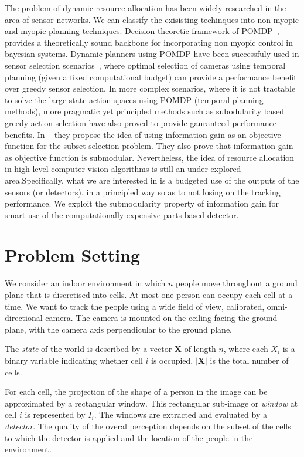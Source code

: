 \documentclass[10pt,twocolumn,letterpaper]{article}
\begin{document}
The problem of dynamic resource allocation has been widely researched in the area of sensor networks. We can classify the exisisting techinques into non-myopic and myopic planning techniques.  Decision theoretic framework of POMDP~\cite{Kaelbling98}, provides a theoretically sound backbone for incorporating non myopic control in bayesian systems. Dynamic planners using POMDP have been successfuly used in sensor selection scenarios~\cite{Spaan09}, where optimal selection of cameras using temporal planning (given a  fixed computational budget) can provide a performance benefit over greedy sensor selection. In more complex scenarios, where it is not tractable to solve the large state-action spaces using POMDP (temporal planning methods), more pragmatic yet principled methods such as subodularity based greedy action selection have also proved to provide gauranteed performance benefits. In ~\cite{krause2012near} they propose the idea of using information gain as an objective function for the subset selection problem. They also prove that information gain as objective function is submodular. Nevertheless, the idea of resource allocation in high level computer vision algorithms is still an under explored area.Specifically, what we are interested in is a budgeted use of the outputs of the sensors (or detectors), in a principled way so as to not losing on the tracking performance. We exploit the submodularity property of information gain for smart use of the computationally expensive parts based detector.


\section{Problem Setting}


We consider an indoor environment in which $ n$ people move throughout a ground plane that is discretised into cells.  At most one person can occupy each cell at a time. We want to track the people using a wide field of view, calibrated, omni-directional camera. The camera is mounted on the ceiling facing the ground plane, with the camera axis perpendicular to the ground plane.

The \emph{state} of the world is described by a vector $\mathbf{X}$ of length $n$, where each $X_i$ is a binary variable indicating whether cell $i$ is occupied. $|\mathbf{X}| $ is the total number of cells. 

For each cell, the projection of the shape of a person in the image can be approximated by a rectangular window. This rectangular sub-image or \emph{window} at cell $ i $ is represented by $ I_{i} $. The windows are extracted and evaluated by a \emph{detector}. The quality of the overal perception depends on the subset of the cells to which the detector is applied and the location of the people in the environment.
\end{document}
